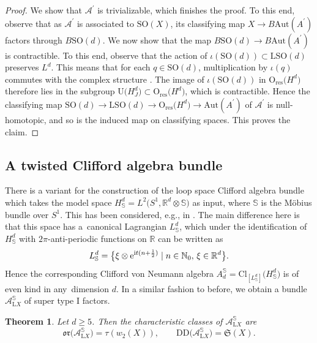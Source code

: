 \documentclass[10pt,a4paper]{amsart}
\numberwithin{equation}{section}
\newtheorem{Theorem}{Theorem}[section]
\newcommand{\R}{\mathbb{R}}
\newcommand{\N}{\mathbb{N}}
\newcommand{\A}{\mathcal{A}}
\newcommand{\Cl}{\mathrm{Cl}}
\newcommand{\SO}{\mathrm{SO}}
\newcommand{\res}{\mathrm{res}}
\newcommand{\Aut}{\mathrm{Aut}}
\newcommand{\U}{\mathrm{U}}
\renewcommand{\O}{\mathrm{O}}
\renewcommand{\L}{\mathrm{L}}
\newcommand{\DD}{\mathrm{DD}}
\newcommand{\oclass}{\mathfrak{or}}
\begin{document}
\begin{proof}
We show that $\mathcal{A}^\prime$ is trivializable, which finishes the proof.
To this end, observe that as $\mathcal{A}^\prime$ is associated to $\SO(X)$, its classifying map $X \to B\Aut(A^\prime)$ factors through $B\SO(d)$.
We now show that the map $B\SO(d) \to B\Aut(A^\prime)$ is contractible.
To this end, observe that the action of $\iota(\SO(d)) \subset \L \SO(d)$ preserves $L^d$.
This means that for each $q \in \SO(d)$, multiplication by $\iota(q)$ commutes with the complex structure .
The image of $\iota(\SO(d))$ in $\O_{\res}\big(H^d\big)$ therefore lies in the subgroup $\U\big(H^d_J\big) \subset \O_{\res}\big(H^d\big)$, which is contractible.
Hence the classifying map $\SO(d) \to \L\SO(d) \to \O_{\res}\big(H^d\big) \to \Aut(A^\prime)$ of $\mathcal{A}^\prime$ is null-homotopic, and so is the induced map on classifying spaces.
This proves the claim.
\end{proof}


\subsection{A twisted Clifford algebra bundle} \label{SectionTwistedBundle}

There is a variant for the construction of the loop space Clifford algebra bundle which takes the model space $
 H^d_{\mathbb{S}} = L^2\big(S^1, \R^d \otimes \mathbb{S}\big)$ as input, where $\mathbb{S}$ is the M\"obius bundle over $S^1$.
This has been considered, e.g., in \cite[Section~6.2]{KristelWaldorf2}.
The main difference here is that this space has a~canonical Lagrangian $L_{\mathbb{S}}^d$, which under the identification of $H^d_{\mathbb{S}}$ with $2\pi$-anti-periodic functions on $\R$ can be written as
\begin{equation}
\label{OtherLagrangian}
 L^d_{\mathbb{S}} = \big\{ \xi \otimes {\rm e}^{{\rm i}t(n+\frac{1}{2})} \mid n \in \N_0, \, \xi \in \R^d\big\}.
\end{equation}
Hence the corresponding Clifford von Neumann algebra $A_d^{\mathbb{S}} = \Cl_{[L^d_{\mathbb{S}}]}\big(H^d_{\mathbb{S}}\big)$ is of even kind in any~di\-men\-sion $d$.
In a similar fashion to before, we obtain a bundle $\A^{\mathbb{S}}_{\L X}$ of super type I factors.

\begin{Theorem}
Let $d \geq 5$.
Then the characteristic classes of $\A_{\L X}^\mathbb{S}$ are
\begin{equation*}
 \oclass\big(\mathcal{A}_{\L X}^{\mathbb{S}}\big) = \tau(w_2(X)), \qquad \DD\big(\A_{\L X}^{\mathbb{S}}\big) = \mathfrak{S}(X).
\end{equation*}
\end{Theorem}
\end{document}
